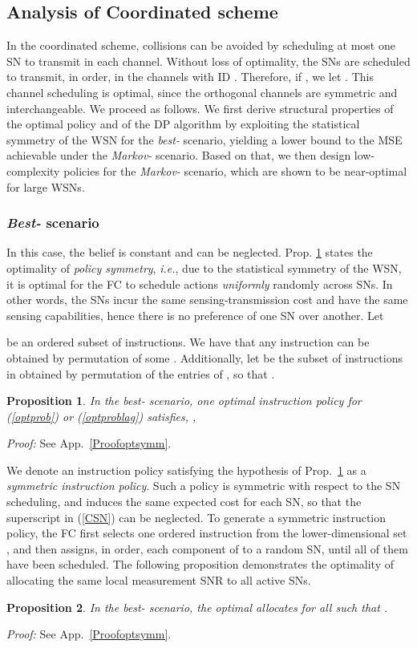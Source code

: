 \documentclass[10pt,twocolumn,twoside]{IEEEtran}
\newtheorem{propos}{Proposition}
\theoremstyle{plain}
\begin{document}
\subsection{Analysis  of Coordinated scheme}
\label{centr}
\noindent In the coordinated scheme, collisions can be avoided by scheduling at most one SN to transmit in each channel.
Without loss of optimality, the SNs are scheduled to transmit, in order, in
the channels with ID . Therefore,
if , we let . This channel scheduling is optimal, since the  orthogonal channels are symmetric and interchangeable.
We proceed as follows. We first derive structural properties of the optimal policy and of the DP
algorithm by exploiting the statistical symmetry of the WSN for the \emph{best-} scenario, yielding a lower bound to the MSE
achievable under the  \emph{Markov-} scenario.
Based on that, we then
design low-complexity policies for the
 \emph{Markov-} scenario, 
 which are shown to be near-optimal for large WSNs.
\subsubsection{\emph{Best-} scenario}
In this case, the belief  is constant and  can be neglected.
 Prop. \ref{optsymm} states the optimality of \emph{policy symmetry}, \emph{i.e.}, due to the statistical symmetry of the WSN,
it is optimal for the FC to schedule actions \emph{uniformly} randomly  across SNs.
In other words, the SNs incur the same sensing-transmission cost
and have the same sensing capabilities, hence there is no preference of one SN over another.
Let

be an ordered subset of instructions. We have that any instruction  can be obtained
by permutation of some . Additionally, let  be the subset of instructions in
 obtained by permutation of the entries of ,
so that . 
\begin{propos}
\label{optsymm}
In the \emph{best-} scenario,
one optimal instruction policy  for (\ref{optprob}) or (\ref{optproblag}) satisfies, ,

\end{propos}
\noindent\emph{Proof:}
See App.~\ref{Proofoptsymm}.
\hfill\QED

\noindent 
We denote an instruction policy satisfying the hypothesis of Prop.~\ref{optsymm}
as a \emph{symmetric instruction policy}. Such a policy is symmetric with respect to the SN scheduling, and induces
 the same expected cost for each SN, so that the superscript  in (\ref{CSN}) can be neglected.
To generate a symmetric instruction policy,
the FC first selects
 one ordered instruction  from the lower-dimensional set , and then
  assigns, in order, each component of  to a random SN, until
all of them have been scheduled. 
The following proposition
  demonstrates the optimality of
allocating the same local measurement SNR to all active SNs.
\begin{propos}
\label{lem2}
In the \emph{best-} scenario,
the optimal  allocates  for all  such that .
\end{propos}
\noindent\emph{Proof:}
See App.~\ref{Proofoptsymm}.
\hfill\QED
\end{document}
